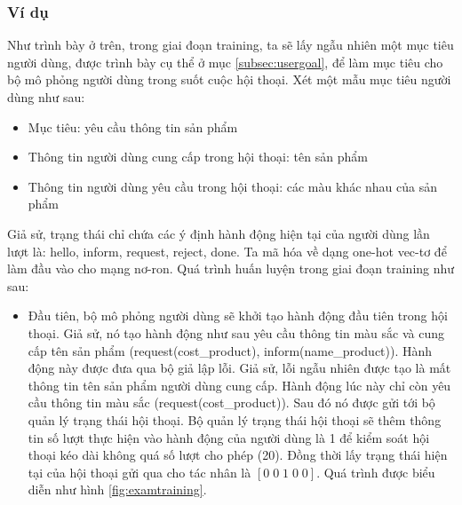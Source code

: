 \subsubsection{Ví dụ}
Như trình bày ở trên, trong giai đoạn training, ta sẽ lấy ngẫu nhiên một mục tiêu người dùng, được trình bày cụ thể ở mục \ref{subsec:usergoal}, để làm mục tiêu cho bộ mô phỏng người dùng trong suốt cuộc hội thoại. Xét một mẫu mục tiêu người dùng như sau:

\begin{itemize}
    \item Mục tiêu: yêu cầu thông tin sản phẩm
    \item Thông tin người dùng cung cấp trong hội thoại: tên sản phẩm
    \item Thông tin người dùng yêu cầu trong hội thoại: các màu khác nhau của sản phẩm
\end{itemize}

Giả sử, trạng thái chỉ chứa các ý định hành động hiện tại của người dùng lần lượt là: hello, inform, request, reject, done. Ta mã hóa về dạng one-hot vec-tơ để làm đầu vào cho mạng nơ-ron. Quá trình huấn luyện trong giai đoạn training như sau:

\begin{itemize}
    \item Đầu tiên, bộ mô phỏng người dùng sẽ khởi tạo hành động đầu tiên trong hội thoại. Giả sử, nó tạo hành động như sau yêu cầu thông tin màu sắc và cung cấp tên sản phẩm (request(cost\_product), inform(name\_product)). Hành động này được đưa qua bộ giả lập lỗi. Giả sử, lỗi ngẫu nhiên được tạo là mất thông tin tên sản phẩm người dùng cung cấp. Hành động lúc này chỉ còn yêu cầu thông tin màu sắc (request(cost\_product)). Sau đó nó được gửi tới bộ quản lý trạng thái hội thoại. Bộ quản lý trạng thái hội thoại sẽ thêm thông tin số lượt thực hiện vào hành động của người dùng là 1 để kiểm soát hội thoại kéo dài không quá số lượt cho phép (20). Đồng thời lấy trạng thái hiện tại của hội thoại gửi qua cho tác nhân là $[0\; 0\; 1\; 0\; 0]$. Quá trình được biểu diễn như hình \ref{fig:examtraining}.
\end{itemize}

